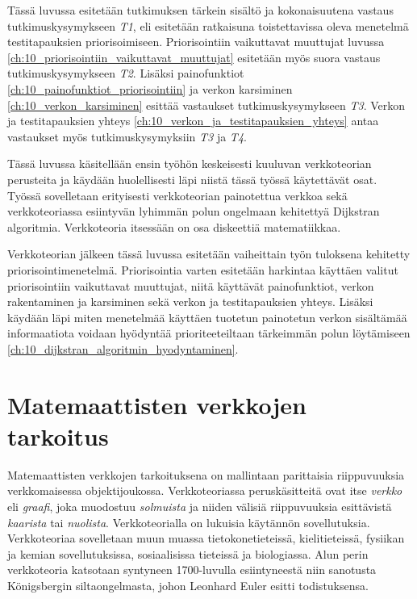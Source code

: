 Tässä luvussa esitetään tutkimuksen tärkein sisältö ja kokonaisuutena vastaus tutkimuskysymykseen \emph{T1}, eli esitetään ratkaisuna toistettavissa oleva menetelmä testitapauksien priorisoimiseen.
Priorisointiin vaikuttavat muuttujat luvussa \ref{ch:10_priorisointiin_vaikuttavat_muuttujat} esitetään myös suora vastaus tutkimuskysymykseen \emph{T2}.
Lisäksi painofunktiot \ref{ch:10_painofunktiot_priorisointiin} ja verkon karsiminen \ref{ch:10_verkon_karsiminen} esittää vastaukset tutkimuskysymykseen \emph{T3}.
Verkon ja testitapauksien yhteys \ref{ch:10_verkon_ja_testitapauksien_yhteys} antaa vastaukset myös tutkimuskysymyksiin \emph{T3} ja \emph{T4}.

Tässä luvussa käsitellään ensin työhön keskeisesti kuuluvan verkkoteorian perusteita ja käydään huolellisesti läpi niistä tässä työssä käytettävät osat.
Työssä sovelletaan erityisesti verkkoteorian painotettua verkkoa sekä verkkoteoriassa esiintyvän lyhimmän polun ongelmaan kehitettyä Dijkstran algoritmia.
Verkkoteoria itsessään on osa diskeettiä matematiikkaa.

Verkkoteorian jälkeen tässä luvussa esitetään vaiheittain työn tuloksena kehitetty priorisointimenetelmä.
Priorisointia varten esitetään harkintaa käyttäen valitut priorisointiin vaikuttavat muuttujat, niitä käyttävät painofunktiot, verkon rakentaminen ja karsiminen sekä verkon ja testitapauksien yhteys.
Lisäksi käydään läpi miten menetelmää käyttäen tuotetun painotetun verkon sisältämää informaatiota voidaan hyödyntää prioriteeteiltaan tärkeimmän polun löytämiseen \ref{ch:10_dijkstran_algoritmin_hyodyntaminen}.

\section{Matemaattisten verkkojen tarkoitus} \label{ch:09_matemaattisten_verkkojen_tarkoitus}

  Matemaattisten verkkojen tarkoituksena on mallintaan parittaisia riippuvuuksia verkkomaisessa objektijoukossa.
  Verkkoteoriassa peruskäsitteitä ovat itse \emph{verkko} eli \emph{graafi}, joka muodostuu \emph{solmuista} ja niiden välisiä riippuvuuksia esittävistä \emph{kaarista} tai \emph{nuolista}.
  Verkkoteorialla on lukuisia käytännön sovellutuksia. Verkkoteoriaa sovelletaan muun muassa tietokonetieteissä, kielitieteissä, fysiikan ja kemian sovellutuksissa, sosiaalisissa tieteissä ja biologiassa.
  Alun perin verkkoteoria katsotaan syntyneen 1700-luvulla esiintyneestä niin sanotusta Königsbergin siltaongelmasta, johon Leonhard Euler esitti todistuksensa.

